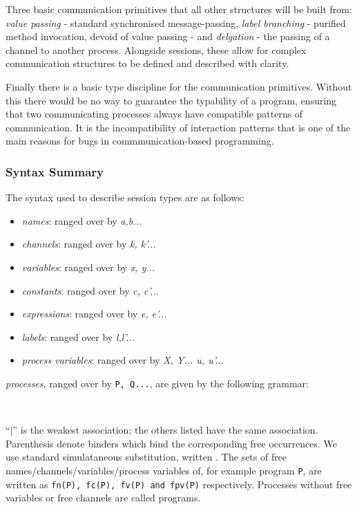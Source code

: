 \documentclass[11pt]{scrartcl}
\begin{document}
Three basic communication primitives that all other structures will be built 
from: \emph{value passing} - standard synchronised message-passing, \emph{
label branching} - purified method invocation, devoid of value passing - and 
\emph{delgation} - the passing of a channel to another process. Alongside 
sessions, these allow for complex communication structures to be defined and 
described with clarity.

Finally there is a basic type discipline for the communication primitives. 
Without this there would be no way to guarantee the typability of a program, 
ensuring that two communicating processes always have compatible patterns of 
communication. It is the incompatibility of interaction patterns that is one 
of the main reasons for bugs in commmunication-based programming.


\subsubsection{Syntax Summary}

The syntax used to describe session types are as follows:

\begin{itemize}
	\item \emph{names}: ranged over by \emph{a,b...}
	\item \emph{channels}: ranged over by \emph{k, k'...}
	\item \emph{variables}: ranged over by \emph{x, y...}
	\item \emph{constants}: ranged over by \emph{c, c'...}
	\item \emph{expressions}: ranged over by \emph{e, e'...}
	\item \emph{labels}: ranged over by \emph{l,l'...}
	\item \emph{process variables}: ranged over by \emph{X, Y... u, u'...}
\end{itemize}

\emph{processes}, ranged over by \texttt{P, Q...}, are given by the following 
grammar:

\begin{verbatim}
 
\end{verbatim}

``$|$'' is the weakest association; the others listed have the same association. 
Parenthesis denote binders which bind the corresponding free occurrences. We use standard simulataneous substitution, written $ $. The sets of free names/channels/variables/process variables of, for example program \texttt{P}, are written as \texttt{fn(P), fc(P), fv(P) and fpv(P)} respectively. Processes without free variables or free channels are called programs.
\end{document}
